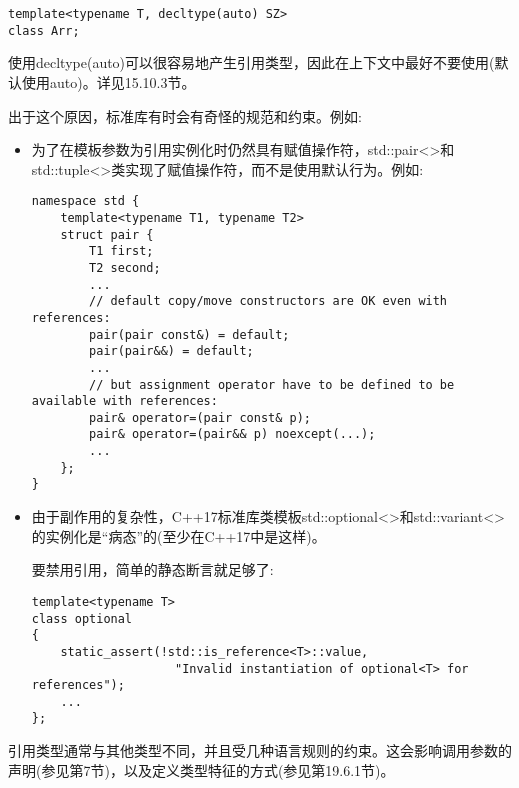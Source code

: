 \begin{lstlisting}[style=styleCXX]
template<typename T, decltype(auto) SZ>
class Arr;
\end{lstlisting}

使用decltype(auto)可以很容易地产生引用类型，因此在上下文中最好不要使用(默认使用auto)。详见15.10.3节。

出于这个原因，标准库有时会有奇怪的规范和约束。例如:

\begin{itemize}
\item
为了在模板参数为引用实例化时仍然具有赋值操作符，std::pair<>和std::tuple<>类实现了赋值操作符，而不是使用默认行为。例如:

\begin{lstlisting}[style=styleCXX]
namespace std {
	template<typename T1, typename T2>
	struct pair {
		T1 first;
		T2 second;
		...
		// default copy/move constructors are OK even with references:
		pair(pair const&) = default;
		pair(pair&&) = default;
		...
		// but assignment operator have to be defined to be available with references:
		pair& operator=(pair const& p);
		pair& operator=(pair&& p) noexcept(...);
		...
	};
}
\end{lstlisting}

\item
由于副作用的复杂性，C++17标准库类模板std::optional<>和std::variant<>的实例化是“病态”的(至少在C++17中是这样)。

要禁用引用，简单的静态断言就足够了:

\begin{lstlisting}[style=styleCXX]
template<typename T>
class optional
{
	static_assert(!std::is_reference<T>::value,
					"Invalid instantiation of optional<T> for references");
	...
};
\end{lstlisting}

\end{itemize}

引用类型通常与其他类型不同，并且受几种语言规则的约束。这会影响调用参数的声明(参见第7节)，以及定义类型特征的方式(参见第19.6.1节)。















